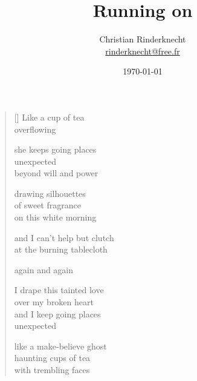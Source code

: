 \documentclass[12pt,a4paper]{article}
\title{Running on}
\author{Christian Rinderknecht\\
{\small \url{rinderknecht@free.fr}}}
\date{\small\today}
\begin{document}
\maketitle


\thispagestyle{empty}


\newpage\leavevmode\thispagestyle{empty}\newpage


\newpage

\poemtitle{}

\settowidth{\versewidth}{Like a make-believe ghost}

\bigskip

\begin{verse}[\versewidth]
  Like a cup of tea \\
  overflowing

  she keeps going places \\
  unexpected \\
  beyond will and power

  drawing silhouettes \\
  of sweet fragrance \\
  on this white morning

  and I can't help but clutch \\
  at the burning tablecloth

  again and again

  I drape this tainted love \\
  over my broken heart \\
  and I keep going places \\
  unexpected

  like a make-believe ghost \\
  haunting cups of tea \\
  with trembling faces
\end{verse}


\newpage

\poemtitle{}

\settowidth{\versewidth}{You hand me a second jar}

\bigskip
\end{document}
